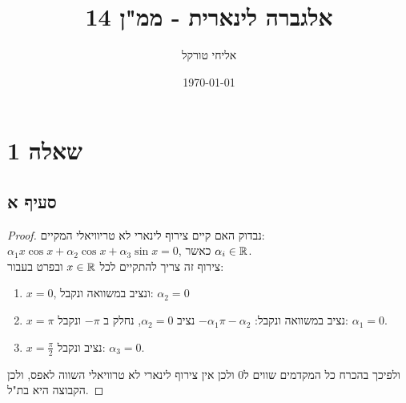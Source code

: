 \documentclass{article}
\title{אלגברה לינארית - ממ"ן 14}
\author{אליחי טורקל \ID}
\date\today
\begin{document}
	\maketitle %

	\section*{שאלה 1}
	\subsection*{סעיף א}
	\begin{proof}
		נבדוק האם קיים צירוף לינארי לא טריוויאלי המקיים: \\
		 $\alpha_1 x \cos x + \alpha_2 \cos x + \alpha_3 \sin x = 0$, כאשר $\alpha_i \in \mathbb{R}$. \\
		צירוף זה צריך להתקיים לכל $x \in \mathbb{R}$ ובפרט בעבור:
		\begin{enumerate}
			\item $x = 0$, ונציב במשוואה ונקבל: $\alpha_2 = 0$
			\item $x = \pi$ נציב במשוואה ונקבל: $-\alpha_1\pi - \alpha_2$ נציב $\alpha_2 = 0$, נחלק ב $-\pi$ ונקבל: $\alpha_1 = 0$.
			\item $x = \frac{\pi}{2}$ נציב ונקבל: $\alpha_3 = 0$.
		\end{enumerate}
		ולפיכך בהכרח כל המקדמים שווים ל0 ולכן אין צירוף לינארי לא טרוויאלי השווה לאפס, ולכן הקבוצה היא בת"ל.
	\end{proof}
\end{document}
